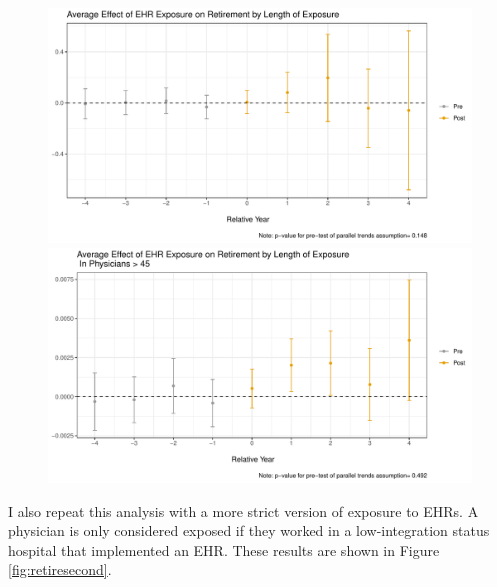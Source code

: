 \documentclass[11pt]{article}
\begin{document}
\begin{figure}[ht]
\caption{}
        \begin{minipage}[b]{0.47\linewidth}
            \centering
            \includegraphics[width=\textwidth]{Objects/ggdid_retire_allEHR.pdf}
        \end{minipage}
        \hspace{0.2cm}
        \begin{minipage}[b]{0.47\linewidth}
            \centering
            \includegraphics[width=\textwidth]{Objects/ggdid_retire_allEHR_old.pdf}
        \end{minipage}
        \label{fig:retirefirst}
\end{figure}

I also repeat this analysis with a more strict version of exposure to EHRs. A physician is only considered exposed if they worked in a low-integration status hospital that implemented an EHR. These results are shown in Figure \ref{fig:retiresecond}. 
\end{document}
